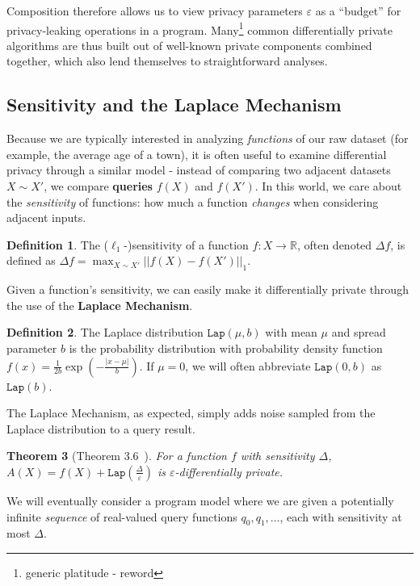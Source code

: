 \documentclass[12pt]{article}
\newcommand{\RR}{\mathbb{R}}
\newcommand{\Lap}{\texttt{Lap}}
\newtheorem{thm}{Theorem}[section]
\theoremstyle{definition}
\newtheorem{defn}[thm]{Definition}
\begin{document}
Composition therefore allows us to view privacy parameters $\varepsilon$ as a ``budget'' for privacy-leaking operations in a program. Many\footnote{generic platitude - reword} common differentially private algorithms are thus built out of well-known private components combined together, which also lend themselves to straightforward analyses. 

\subsection{Sensitivity and the Laplace Mechanism}

Because we are typically interested in analyzing \textit{functions} of our raw dataset (for example, the average age of a town), it is often useful to examine differential privacy through a similar model - instead of comparing two adjacent datasets $X\sim X'$, we compare \textbf{queries} $f(X)$ and $f(X')$. In this world, we care about the \textit{sensitivity} of functions: how much a function \textit{changes} when considering adjacent inputs.  

\begin{defn}
    The ($\ell_1$-)sensitivity of a function $f: X\to \RR$, often denoted $\Delta f$, is defined as $\Delta f = \max_{X\sim X'}||f(X)-f(X')||_1$.
\end{defn}

Given a function's sensitivity, we can easily make it differentially private through the use of the \textbf{Laplace Mechanism}.

\begin{defn}
    The Laplace distribution $\Lap(\mu, b)$ with mean $\mu$ and spread parameter $b$ is the probability distribution with probability density function $f(x) = \frac{1}{2b}\exp(-\frac{|x-\mu|}{b})$. If $\mu =0$, we will often abbreviate $\Lap(0, b)$ as $\Lap(b)$. 
\end{defn}

The Laplace Mechanism, as expected, simply adds noise sampled from the Laplace distribution to a query result. 

\begin{thm}[Theorem 3.6~\cite{dworkrothmonograph}]
    For a function $f$ with sensitivity $\Delta$, $A(X) = f(X) + \Lap(\frac{\Delta}{\varepsilon})$ is $\varepsilon$-differentially private. 
\end{thm}

We will eventually consider a program model where we are given a potentially infinite \textit{sequence} of real-valued query functions $q_0, q_1, \ldots$, each with sensitivity at most $\Delta$.
\end{document}
